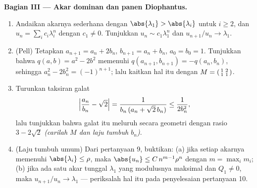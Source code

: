 \begin{problem}
\medskip
\noindent\textbf{Bagian III --- Akar dominan dan panen
Diophantus.}
\begin{enumerate}[resume]
  \item Andaikan akarnya sederhana dengan $\abs{\lambda_1} >
        \abs{\lambda_i}$ untuk $i \geq 2$, dan $u_n = \sum_i c_i
        \lambda_i^n$ dengan $c_1 \neq 0$. Tunjukkan $u_n \sim
        c_1\lambda_1^n$ dan $u_{n+1}/u_n \to \lambda_1$.
  \item (Pell) Tetapkan $a_{n+1} = a_n + 2b_n$, $b_{n+1} = a_n +
        b_n$, $a_0 = b_0 = 1$. Tunjukkan bahwa $q(a, b) = a^2 - 2b^2$
        memenuhi $q(a_{n+1}, b_{n+1}) = -q(a_n, b_n)$, sehingga
        $a_n^2 - 2b_n^2 = (-1)^{n+1}$; lalu kaitkan hal itu dengan
         $M = \begin{psmallmatrix}1 & 2\\ 1 &
        1\end{psmallmatrix}$.
  \item Turunkan taksiran galat
        \[
        \Bigl|\frac{a_n}{b_n} - \sqrt2\Bigr|
        = \frac{1}{b_n\,(a_n + \sqrt2\,b_n)}
        \leq \frac{1}{2b_n^2},
        \]
        lalu tunjukkan bahwa galat itu meluruh secara geometri dengan
        rasio $3 - 2\sqrt2$ \emph{(carilah  $M$ dan laju
        tumbuh $b_n$)}.
  \item (Laju tumbuh umum) Dari pertanyaan 9, buktikan: (a) jika setiap
        akarnya memenuhi $\abs{\lambda_i} \leq \rho$, maka
        $\abs{u_n} \leq C\,n^{m-1}\rho^n$ dengan $m = \max_i m_i$;
        (b) jika ada satu akar tunggal $\lambda_1$ yang modulusnya
        maksimal dan $Q_1 \neq 0$, maka $u_{n+1}/u_n \to
        \lambda_1$ --- periksalah hal itu pada penyelesaian pertanyaan 10.
\end{enumerate}


\end{problem}
